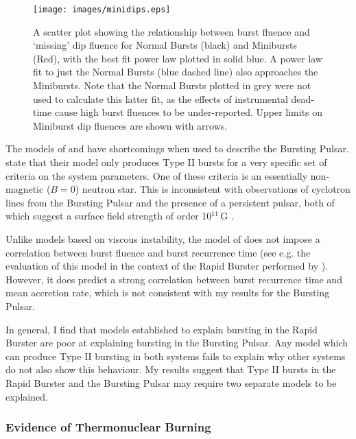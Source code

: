 \begin{figure}
  \centering
  \texttt{[image: images/minidips.eps]}
  \caption[A scatter plot showing the relationship between burst fluence and `missing' dip fluence for Normal Bursts and Minibursts.]{\small A scatter plot showing the relationship between burst fluence and `missing' dip fluence for Normal Bursts (black) and Minibursts (Red), with the best fit power law plotted in solid blue.  A power law fit to just the Normal Bursts (blue dashed line) also approaches the Minibursts.  Note that the Normal Bursts plotted in grey were not used to calculate this latter fit, as the effects of instrumental dead-time cause high burst fluences to be under-reported.  Upper limits on Miniburst dip fluences are shown with arrows.}
  \label{fig:minidips}
\end{figure}

\par The models of \citet{Spruit_Type2Mod} and \citet{Walker_Type2Mod} have shortcomings when used to describe the Bursting Pulsar.  \citet{Walker_Type2Mod} state that their model only produces Type II bursts for a very specific set of criteria on the system parameters.   One of these criteria is an essentially non-magnetic ($B=0$) neutron star.  This is inconsistent with observations of cyclotron lines from the Bursting Pulsar and the presence of a persistent pulsar, both of which suggest a surface field strength of order 10$^{11}$\,G \citep{Doroshenko_NBFlash}.
\par Unlike models based on viscous instability, the model of \citet{Spruit_Type2Mod} does not impose a correlation between burst fluence and burst recurrence time (see e.g. the evaluation of this model in the context of the Rapid Burster performed by \citealp{Bagnoli_PopStudy}).  However, it does predict a strong correlation between burst recurrence time and mean accretion rate, which is not consistent with my results for the Bursting Pulsar.
\par In general, I find that models established to explain bursting in the Rapid Burster are poor at explaining bursting in the Bursting Pulsar.  Any model which can produce Type II bursting in both systems fails to explain why other systems do not also show this behaviour.  My results suggest that Type II bursts in the Rapid Burster and the Bursting Pulsar may require two separate models to be explained.

\subsubsection{Evidence of Thermonuclear Burning}

